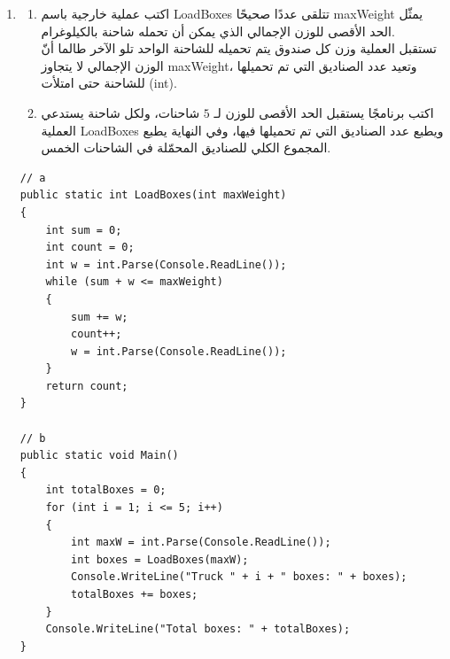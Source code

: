 \documentclass[14pt]{extarticle}
\begin{document}
\begin{enumerate}[resume, itemsep=2em]
\item
\begin{enumerate}
    \item اكتب عملية خارجية باسم \textenglish{LoadBoxes} تتلقى عددًا صحيحًا \textenglish{maxWeight} يمثّل الحد الأقصى للوزن الإجمالي الذي يمكن أن تحمله شاحنة بالكيلوغرام. \\
    تستقبل العملية وزن كل صندوق يتم تحميله للشاحنة الواحد تلو الآخر طالما أنّ الوزن الإجمالي لا يتجاوز \textenglish{maxWeight}، وتعيد عدد الصناديق التي تم تحميلها للشاحنة حتى امتلأت (\textenglish{int}).
    \item اكتب برنامجًا يستقبل الحد الأقصى للوزن لـ $5$ شاحنات، ولكل شاحنة يستدعي العملية \textenglish{LoadBoxes} ويطبع عدد الصناديق التي تم تحميلها فيها، وفي النهاية يطبع المجموع الكلي للصناديق المحمّلة في الشاحنات الخمس.
\end{enumerate}
\ifwithsols
\begin{boxSolution}
\begin{english}
\begin{verbatim}
// a
public static int LoadBoxes(int maxWeight)
{
    int sum = 0;
    int count = 0;
    int w = int.Parse(Console.ReadLine());
    while (sum + w <= maxWeight)
    {
        sum += w;
        count++;
        w = int.Parse(Console.ReadLine());
    }
    return count;
}

// b
public static void Main()
{
    int totalBoxes = 0;
    for (int i = 1; i <= 5; i++)
    {
        int maxW = int.Parse(Console.ReadLine());
        int boxes = LoadBoxes(maxW);
        Console.WriteLine("Truck " + i + " boxes: " + boxes);
        totalBoxes += boxes;
    }
    Console.WriteLine("Total boxes: " + totalBoxes);
}
\end{verbatim}
\end{english}
\end{boxSolution}
\fi
\filbreak


\end{enumerate}
\end{document}
